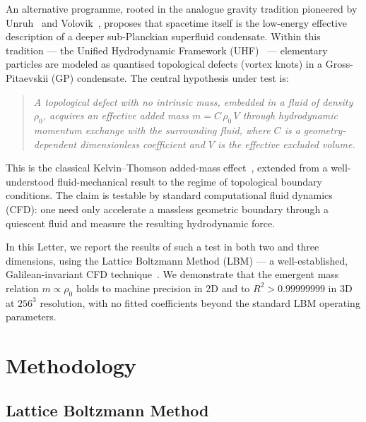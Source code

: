 \documentclass[reprint,amsmath,amssymb,aps,pre,floatfix]{revtex4-2}
\begin{document}
An alternative programme, rooted in the analogue gravity tradition pioneered
by Unruh~\cite{Unruh1981} and Volovik~\cite{Volovik2003}, proposes that
spacetime itself is the low-energy effective description of a deeper
sub-Planckian superfluid condensate.  Within this tradition --- the Unified
Hydrodynamic Framework (UHF)~\cite{Amit2026} --- elementary particles are
modeled as quantised topological defects (vortex knots) in a
Gross-Pitaevskii (GP) condensate.  The central hypothesis under test is:

\begin{quote}
\emph{A topological defect with no intrinsic mass, embedded in a fluid
of density~$\rho_0$, acquires an effective added mass
$m=C\,\rho_0\,V$ through hydrodynamic momentum exchange with the
surrounding fluid, where $C$ is a geometry-dependent dimensionless
coefficient and $V$ is the effective excluded volume.}
\end{quote}

This is the classical Kelvin--Thomson added-mass
effect~\cite{Kelvin1868,Lamb1932}, extended from a well-understood fluid-mechanical
result to the regime of topological boundary conditions.  The claim is
testable by standard computational fluid dynamics (CFD): one need only
accelerate a massless geometric boundary through a quiescent fluid and
measure the resulting hydrodynamic force.

In this Letter, we report the results of such a test in both two and three
dimensions, using the Lattice Boltzmann Method (LBM) --- a well-established,
Galilean-invariant CFD technique~\cite{Chen1998}.  We demonstrate that the
emergent mass relation $m\propto\rho_0$ holds to machine precision in 2D
and to $R^{2}>0.99999999$ in 3D at $256^{3}$ resolution, with no fitted coefficients beyond the standard LBM operating parameters.

\section{Methodology}
\label{sec:method}

\subsection{Lattice Boltzmann Method}
\label{sec:lbm}
\end{document}
